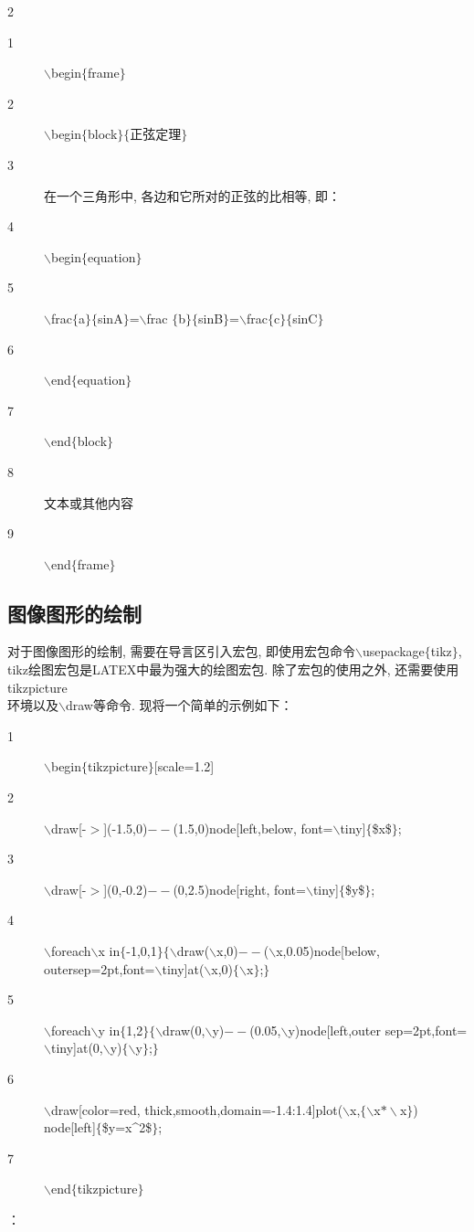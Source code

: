  \begin{multicols}{2}
\begin{description}
  \item[1]$\backslash$begin$\{$frame$\}$%
  \item[2]$\backslash$begin$\{$block$\}\{$正弦定理$\}$%
  \item[3] 在一个三角形中, 各边和它所对的正弦的比相等, 即：
  \item[4]$\backslash$begin$\{$equation$\}$
 \item[5]$\backslash$frac$\{$a$\}\{$sinA$\}$=$\backslash$frac
    $\{$b$\}\{$sinB$\}$=$\backslash$frac$\{$c$\}\{$sinC$\}$
 \item[6]$\backslash$end$\{$equation$\}$
 \item[7]$\backslash$end$\{$block$\}$
 \item[8] 文本或其他内容
 \item[9]$\backslash$end$\{$frame$\}$
\end{description}
 \end{multicols}

\subsection{图像图形的绘制}

对于图像图形的绘制, 需要在导言区引入宏包, 即使用宏包命令$\backslash$usepackage$\{$tikz$\}$, tikz绘图宏包是LATEX中最为强大的绘图宏包. 除了宏包的使用之外, 还需要使用tikzpicture\\环境以及$\backslash$draw等命令. 现将一个简单的示例如下：
\begin{description}
    \item[1]$\backslash$begin$\{$tikzpicture$\}$[scale=1.2]
    \item[2]$\backslash$draw[-$>$](-1.5,0)$--$(1.5,0)node[left,below,
        font=$\backslash$tiny]$\{$\$x\$$\}$;
    \item[3] $\backslash$draw[-$>$](0,-0.2)$--$(0,2.5)node[right,
        font=$\backslash$tiny]$\{$\$y\$$\}$;
    \item[4]$\backslash$foreach$\backslash$x in$\{$-1,0,1$\}\{\backslash$draw($\backslash$x,0)$--$($\backslash$x,0.05)node[below,
        outersep=2pt,font=$\backslash$tiny]at($\backslash$x,0)$\{\backslash$x$\}$;$\}$
    \item[5]$\backslash$foreach$\backslash$y in$\{$1,2$\}\{\backslash$draw(0,$\backslash$y)$--$(0.05,$\backslash$y)node[left,outer sep=2pt,font=$\backslash$tiny]at(0,$\backslash$y)$\{\backslash$y$\}$;$\}$
    \item[6]$\backslash$draw[color=red, thick,smooth,domain=-1.4:1.4]plot($\backslash$x,$\{\backslash$x$*\backslash$x$\}$)
        node[left]$\{$\$y=x\^{}2\$$\}$;
    \item[7]$\backslash$end$\{$tikzpicture$\}$
  \end{description}
  ：

